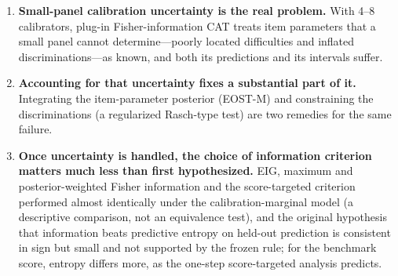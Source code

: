 \begin{enumerate}\itemsep2pt
\item \textbf{Small-panel calibration uncertainty is the real problem.} With 4--8
calibrators, plug-in Fisher-information CAT treats item parameters that a small panel
cannot determine---poorly located difficulties and inflated discriminations---as known,
and both its predictions and its intervals suffer.
\item \textbf{Accounting for that uncertainty fixes a substantial part of it.} Integrating
the item-parameter posterior (EOST-M) and constraining the discriminations (a regularized
Rasch-type test) are two remedies for the same failure. \StudyTwoIntroMsgTwo
\item \textbf{Once uncertainty is handled, the choice of information criterion matters
much less than first hypothesized.} EIG, maximum and posterior-weighted Fisher information
and the score-targeted criterion performed almost identically under the
calibration-marginal model (a descriptive comparison, not an equivalence test), and the
original hypothesis that information beats predictive entropy on held-out prediction is
consistent in sign but small and not supported by the frozen rule; for the benchmark score,
entropy differs more, as the one-step score-targeted analysis predicts.
\end{enumerate}

